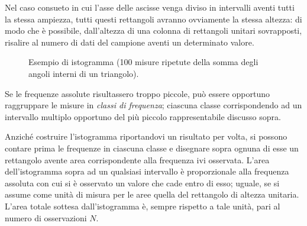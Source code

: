 Nel caso consueto in cui l'asse delle ascisse venga diviso
in intervalli aventi tutti la stessa ampiezza, tutti questi
rettangoli avranno ovviamente la stessa altezza: di modo che
\`e possibile, dall'altezza di una colonna di rettangoli
unitari sovrapposti, risalire al numero di dati del campione
aventi un determinato valore.
\begin{figure}[htbp]
  \vspace*{2ex}
  \begin{center} {
    
  } \end{center}
  \caption[Istogramma di un campione di misure]
  {Esempio di istogramma (100 misure ripetute della somma
    degli angoli interni di un triangolo).}
  \label{fig:4.istri}
\end{figure}

Se le frequenze assolute risultassero troppo piccole, pu\`o
essere opportuno raggruppare le misure in \emph{classi di
  frequenza};%
ciascuna classe corrispondendo ad un intervallo multiplo
opportuno del pi\`u piccolo rappresentabile discusso sopra.

Anzich\'e costruire l'istogramma riportandovi un risultato
per volta, si possono contare prima le frequenze in ciascuna
classe e disegnare sopra ognuna di esse un rettangolo avente
area corrispondente alla frequenza ivi osservata.  L'area
dell'istogramma sopra ad un qualsiasi intervallo \`e
proporzionale alla frequenza assoluta con cui si \`e
osservato un valore che cade entro di esso; uguale, se si
assume come unit\`a di misura per le aree quella del
rettangolo di altezza unitaria.  L'area totale sottesa
dall'istogramma \`e, sempre rispetto a tale unit\`a, pari al
numero di osservazioni $N$.%

